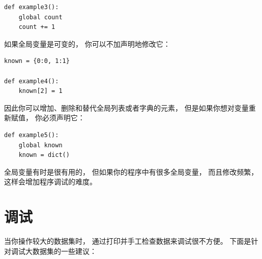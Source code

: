 
\begin{lstlisting}
def example3():
    global count
    count += 1
\end{lstlisting}

%

如果全局变量是可变的， 你可以不加声明地修改它：


\begin{lstlisting}
known = {0:0, 1:1}

def example4():
    known[2] = 1
\end{lstlisting}

%

因此你可以增加、删除和替代全局列表或者字典的元素，
但是如果你想对变量重新赋值， 你必须声明它：

\begin{lstlisting}
def example5():
    global known
    known = dict()
\end{lstlisting}

%

全局变量有时是很有用的， 但如果你的程序中有很多全局变量， 而且修改频繁，
这样会增加程序调试的难度。

\section{调试}


当你操作较大的数据集时， 通过打印并手工检查数据来调试很不方便。
下面是针对调试大数据集的一些建议：

